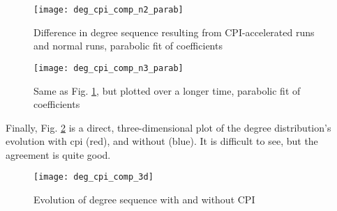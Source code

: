 \documentclass[11pt]{article}
\begin{document}
\begin{figure}[!h]
  \texttt{[image: deg\_cpi\_comp\_n2\_parab]}
  \caption{Difference in degree sequence resulting from CPI-accelerated runs and normal runs, parabolic fit of coefficients}
  \label{fig:degcomp_n2_parab}
\end{figure}

\begin{figure}[!h]
  \texttt{[image: deg\_cpi\_comp\_n3\_parab]}
  \caption{Same as Fig. \ref{fig:degcomp_n2_parab}, but plotted over a longer time, parabolic fit of coefficients}
\end{figure}


Finally, Fig. \ref{fig:evo_3d} is a direct, three-dimensional plot of the degree distribution's evolution with cpi (red), and without (blue). It is difficult to see, but the agreement is quite good.

\begin{figure}[!h]
  \texttt{[image: deg\_cpi\_comp\_3d]}
  \caption{Evolution of degree sequence with and without CPI}
  \label{fig:evo_3d}
\end{figure}


\end{document}
